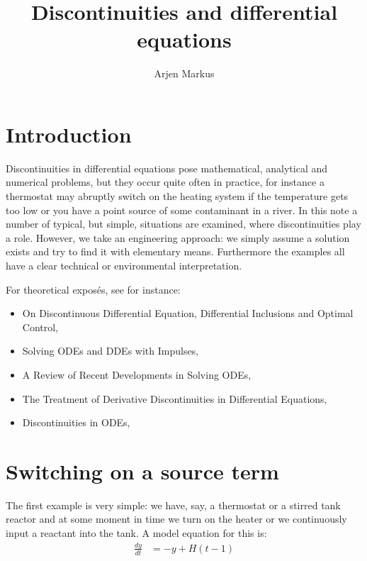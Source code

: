 \documentclass[onecolumn]{article}
\begin{document}
\title{Discontinuities and differential equations}

\author{Arjen Markus}

\maketitle


\section*{Introduction}
Discontinuities in differential equations pose mathematical, analytical and numerical problems, but
they occur quite often in practice, for instance a thermostat may abruptly switch on the heating system if the
temperature gets too low or you have a point source of some contaminant in a river. In this note
a number of typical, but simple, situations are examined, where discontinuities play a role.
However, we take an engineering approach: we simply assume a solution exists and try to find it
with elementary means. Furthermore the examples all have a clear technical or environmental interpretation.

For theoretical expos\'es, see for instance:
\begin{itemize}
\item
On Discontinuous Differential Equation, Differential Inclusions and Optimal Control, \cite{OnDiscontinousDifferentialEqs}
\item
Solving ODEs and DDEs with Impulses, \cite{SolvingODEsDDEs}
\item
A Review of Recent Developments in Solving ODEs, \cite{ReviewRecentDevelopments}
\item
The Treatment of Derivative Discontinuities in Differential Equations, \cite{TreatmentDerivativeDiscontinuities}
\item
Discontinuities in ODEs, \cite{DiscontinuitiesODEs}
\end{itemize}

\section*{Switching on a source term}
The first example is very simple: we have, say, a thermostat or a stirred tank reactor and at some moment
in time we turn on the heater or we continuously input a reactant into the tank. A model equation for
this is:
%
\begin{align}
    \frac{dy}{dt} &= -y + H(t-1)
\end{align}
\end{document}

